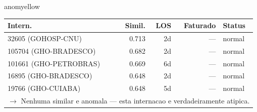 \documentclass[a4paper,10pt]{article}
\begin{document}
\begin{anomalycard}[Internacao 3000 | GHO-PETROBRAS | MODERADO (z=2.28)]{anomyellow}
\begin{tabular}{l r r r l}\toprule\textbf{Intern.} & \textbf{Simil.} & \textbf{LOS} & \textbf{Faturado} & \textbf{Status} \\\midrule
32605 (GOHOSP-CNU) & 0.713 & 2d & --- & \textcolor{jcubeblue}{normal} \\
105704 (GHO-BRADESCO) & 0.682 & 2d & --- & \textcolor{jcubeblue}{normal} \\
101661 (GHO-PETROBRAS) & 0.669 & 6d & --- & \textcolor{jcubeblue}{normal} \\
16895 (GHO-BRADESCO) & 0.648 & 2d & --- & \textcolor{jcubeblue}{normal} \\
19766 (GHO-CUIABA) & 0.648 & 5d & --- & \textcolor{jcubeblue}{normal} \\
\multicolumn{5}{l}{\textcolor{jcubeblue}{\small $\rightarrow$ Nenhuma similar e anomala --- esta internacao e verdadeiramente atipica.}} \\
\bottomrule\end{tabular}


\end{anomalycard}

\newpage
\end{document}
